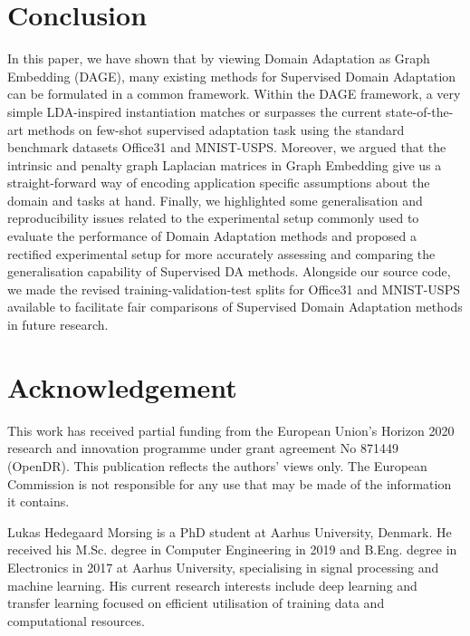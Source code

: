 \documentclass[journal]{IEEEtran}
\begin{document}
 \section{Conclusion} \label{sec:conclusion}
In this paper, we have shown that by viewing Domain Adaptation as Graph Embedding (DAGE), many existing methods for Supervised Domain Adaptation can be formulated in a common framework. 
Within the DAGE framework, a very simple LDA-inspired instantiation matches or surpasses the current state-of-the-art methods on few-shot supervised adaptation task using the standard benchmark datasets Office31 and MNIST-USPS.
Moreover, we argued that the intrinsic and penalty graph Laplacian matrices in Graph Embedding give us a straight-forward way of encoding application specific assumptions about the domain and tasks at hand. 
Finally, we highlighted some generalisation and reproducibility issues related to the experimental setup commonly used to evaluate the performance of Domain Adaptation methods and proposed a rectified experimental setup for more accurately assessing and comparing the generalisation capability of Supervised DA methods. Alongside our source code, we made the revised training-validation-test splits for Office31 and MNIST-USPS available to facilitate fair comparisons of Supervised Domain Adaptation methods in future research. \section*{Acknowledgement}
This work has received partial funding from the European Union’s Horizon 2020 research and innovation programme under grant agreement No 871449 (OpenDR). This publication reflects the authors’ views only. The European Commission is not responsible for any use that may be made of the information it contains. 













\renewcommand*{\bibfont}{\small}





\begin{IEEEbiography}{Lukas Hedegaard Morsing}
is a PhD student at Aarhus University, Denmark. He received his M.Sc. degree in Computer Engineering in 2019 and B.Eng. degree in Electronics in 2017 at Aarhus University, specialising in signal processing and machine learning. His current research interests include deep learning and transfer learning focused on efficient utilisation of training data and computational resources.
\end{IEEEbiography}
\end{document}
